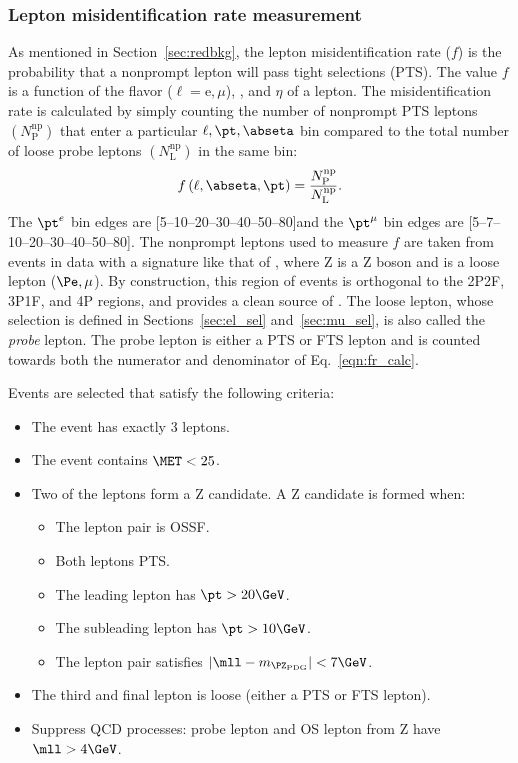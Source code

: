 \subsubsection{Lepton misidentification rate measurement}
\label{sec:fr_evtsel}
As mentioned in Section~\ref{sec:redbkg}, the lepton misidentification rate ($f$) is the probability that a nonprompt lepton will pass tight selections (PTS).
The value $f$ is a function of the flavor ($\ell = \text{e}, \mu$), \pt, and $\eta$ of a lepton.
The misidentification rate is calculated by simply counting the number of nonprompt PTS leptons $\left( N^{\mathrm{np}}_{\mathrm{P}} \right)$ that enter a particular $\ell, \pt, \abseta$ bin compared to the total number of loose probe leptons $\left( N^{\mathrm{np}}_{\mathrm{L}} \right)$ in the same bin:
\begin{equation}
	\label{eqn:fr_calc}
	f\left( \ell, \abseta, \pt \right) = 
	\frac{
		N^{\mathrm{np}}_{\mathrm{P}}
		}{
		N^{\mathrm{np}}_{\mathrm{L}}
		}.
\end{equation}
The $\pt^e$ bin edges are [5--10--20--30--40--50--80]\GeV and the $\pt^{\mu}$ bin edges are [5--7--10--20--30--40--50--80]\GeV.
The nonprompt leptons used to measure $f$ are taken from events in data with a signature like that of \ZplusL, where Z is a Z boson and \looselep is a loose lepton ($\Pe, \mu$).
By construction, this region of events is orthogonal to the 2P2F, 3P1F, and 4P regions, and provides a clean source of \looselep.
The loose lepton, whose selection is defined in Sections~\ref{sec:el_sel} and~\ref{sec:mu_sel}, is also called the \emph{probe} lepton.
The probe lepton is either a PTS or FTS lepton and is counted towards both the numerator and denominator of Eq.~\ref{eqn:fr_calc}. 

Events are selected that satisfy the following criteria:
\begin{itemize}
	\item The event has exactly 3 leptons.
	\item The event contains $\MET < 25$\GeV.
	\item Two of the leptons form a Z candidate. A Z candidate is formed when:
	\begin{itemize}
		\item The lepton pair is OSSF.
		\item Both leptons PTS.
		\item The leading lepton has $\pt > 20\GeV$.
		\item The subleading lepton has $\pt > 10\GeV$.
		\item The lepton pair satisfies $\left| \mll - m_{\PZ_{\text{PDG}}} \right| < 7\GeV$.
	\end{itemize}
	\item The third and final lepton is loose (\ie either a PTS or FTS lepton).
	\item Suppress QCD processes: probe lepton and OS lepton from Z have $\mll > 4\GeV$.
\end{itemize}

